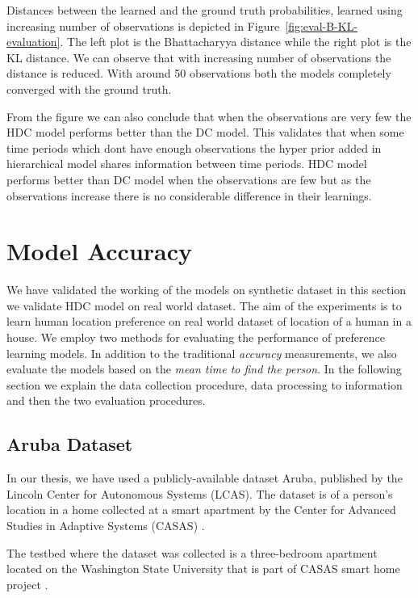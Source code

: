 Distances between the learned and the ground truth probabilities, learned using increasing number of observations is depicted in Figure~\ref{fig:eval-B-KL-evaluation}. The left plot is the Bhattacharyya distance while the right plot is the KL distance. We can observe that with increasing number of observations the distance is reduced. With around 50 observations both the models  completely converged with the ground truth.  

From the figure we can also conclude that when the observations are very few the HDC model performs better than the DC model. This validates that when some time periods which dont have enough observations the hyper prior added in hierarchical model shares information between time periods. HDC model performs better than DC model when the observations are few but as the observations increase there is no considerable difference in their learnings.

\section{Model Accuracy}

We have validated the working of the models on synthetic dataset in this section we validate HDC model on real world dataset. The aim of the experiments is to learn human location preference on real world dataset of location of a human in a house. We employ two methods for evaluating the performance of preference learning models. In addition to the traditional \emph{accuracy} measurements, we also evaluate the models based on the \emph{mean time to find the person}.  In the following section we explain the data collection procedure, data processing to information and then the two evaluation procedures.
 
\subsection{Aruba Dataset}
In our thesis, we have used a  publicly-available  dataset Aruba, published by the Lincoln Center for Autonomous Systems (LCAS). The dataset is of a person's location in a home collected at a smart apartment by the Center for Advanced Studies in Adaptive Systems (CASAS) \cite{aruba} .

The testbed where the dataset was collected is a  three-bedroom apartment located on the Washington State University that is part of CASAS smart home project \cite{aruba}. 


